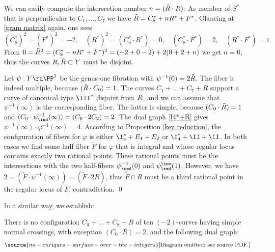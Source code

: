 We can easily compute the intersection number    $n=(\tilde{R}\cdot R)$: As member of $S^*$ that is perpendicular to $C_1,\ldots,C_7$ we   have
$\tilde{R} = C_8^*+ nR^* + F^*$.  Glancing at  \eqref{gram matrix} again, one sees
$$
(C_8^*)^2=(F^*)^2=-2,\quad (R^*)^2= (C_8^*\cdot R^*) = 0,\quad (C_8^*\cdot F^*) = 2,\quad (R^*\cdot F^*) = 1.
$$
From
$0=\tilde{R}^2=(C_8^*+ nR^* + F^*)^2 = (-2 + 0 -2) + 2(0+2+n)$ we get $n=0$, thus the curves $R,\tilde{R}\subset Y$ must be disjoint.

Let $\psi:Y\ra\PP^1$ be the   genus-one fibration with $\psi^{-1}(0)=2\tilde{R}$.  The fiber is indeed multiple,
because $(\tilde{R}\cdot C_0)=1$.  The curves $C_1+\ldots+C_7+R$ support a curve of canonical type $\III^*$ disjoint from $\tilde{R}$,
and we can assume that $\psi^{-1}(\infty)$ is the corresponding fiber. The latter is simple, because
$(C_0\cdot \tilde{R})=1$ and $(C_0\cdot\psi^{-1}_\ind(\infty)) = (C_0\cdot 2C_2)=2$. The dual graph \eqref{I4*+R} gives
$\psi^{-1}(\infty)\cdot \varphi^{-1}(\infty)=4$.
According to Proposition \ref{key reduction}, the configuration of fibers   for $\varphi$ is either $\I_4^*+E_4+E_2$ or $\I_4^*+\II+\II$.
In both cases we find some half fiber $\tilde{F}$ for $\varphi$ that is integral and whose  regular locus contains exactly two    rational points.
These rational points must be the intersections with the two half-fibers $\psi^{-1}_\red(0)$ and $\psi^\inv_\red(1)$.
However, we have $2=(\tilde{F}\cdot \psi^{-1}(\infty))=(\tilde{F}\cdot 2R)$, thus $\tilde{F}\cap R$ must be a third rational point in the regular locus of $\tilde{F}$,
contradiction.
\qed


In a similar way, we establish:

\begin{proposition}
\notready
\label{no I4*+R second}
There is no configuration $C_0+\ldots+C_8+R$ of ten $(-2)$-curves
having    simple normal crossings, with   exception  $(C_0\cdot R)=2$, and the following dual graph:
\begin{equation}
\label{I4*+R second}
\source{no-enriques-surface-over-the-integers}
\begin{gathered}
\text{[Diagram omitted; see source PDF.]}
\end{gathered}
\end{equation}
\end{proposition}

